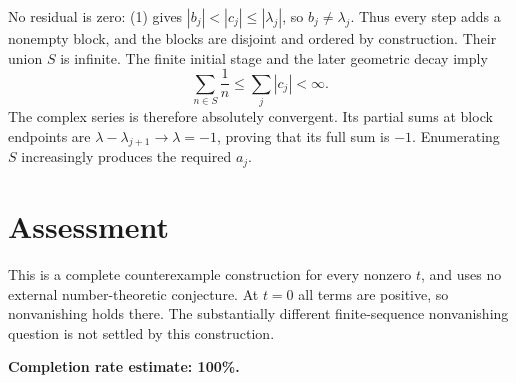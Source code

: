 \documentclass[11pt]{article}
\begin{document}
No residual is zero: (1) gives $|b_j|<|c_j|\le|\lambda_j|$, so $b_j\ne\lambda_j$. Thus every step adds a nonempty block, and the blocks are disjoint and ordered by construction. Their union $S$ is infinite. The finite initial stage and the later geometric decay imply
\[
 \sum_{n\in S}\frac1n\le\sum_j|c_j|<\infty.
\]
The complex series is therefore absolutely convergent. Its partial sums at block endpoints are $\lambda-\lambda_{j+1}\to\lambda=-1$, proving that its full sum is $-1$. Enumerating $S$ increasingly produces the required $a_j$.

\section*{Assessment}
This is a complete counterexample construction for every nonzero $t$, and uses no external number-theoretic conjecture. At $t=0$ all terms are positive, so nonvanishing holds there. The substantially different finite-sequence nonvanishing question is not settled by this construction.

\textbf{Completion rate estimate: 100\%.}
\end{document}
